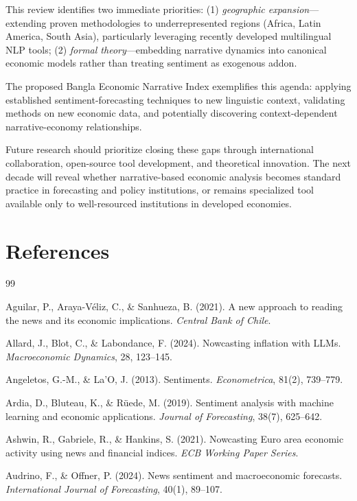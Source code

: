 \documentclass[11pt]{article}
\begin{document}
{{This review identifies two immediate priorities: (1) \textit{geographic expansion}—extending proven methodologies to underrepresented regions (Africa, Latin America, South Asia), particularly leveraging recently developed multilingual NLP tools; (2) \textit{formal theory}—embedding narrative dynamics into canonical economic models rather than treating sentiment as exogenous addon.

The proposed Bangla Economic Narrative Index exemplifies this agenda: applying established sentiment-forecasting techniques to new linguistic context, validating methods on new economic data, and potentially discovering context-dependent narrative-economy relationships.

Future research should prioritize closing these gaps through international collaboration, open-source tool development, and theoretical innovation. The next decade will reveal whether narrative-based economic analysis becomes standard practice in forecasting and policy institutions, or remains specialized tool available only to well-resourced institutions in developed economies.

\section*{References}

\begin{thebibliography}{99}

 Aguilar, P., Araya-Véliz, C., \& Sanhueza, B. (2021). A new approach to reading the news and its economic implications. \textit{Central Bank of Chile}.

 Allard, J., Blot, C., \& Labondance, F. (2024). Nowcasting inflation with LLMs. \textit{Macroeconomic Dynamics}, 28, 123--145.

 Angeletos, G.-M., \& La'O, J. (2013). Sentiments. \textit{Econometrica}, 81(2), 739--779.

 Ardia, D., Bluteau, K., \& Rüede, M. (2019). Sentiment analysis with machine learning and economic applications. \textit{Journal of Forecasting}, 38(7), 625--642.

 Ashwin, R., Gabriele, R., \& Hankins, S. (2021). Nowcasting Euro area economic activity using news and financial indices. \textit{ECB Working Paper Series}.

 Audrino, F., \& Offner, P. (2024). News sentiment and macroeconomic forecasts. \textit{International Journal of Forecasting}, 40(1), 89--107.


\end{thebibliography}}}
\end{document}
